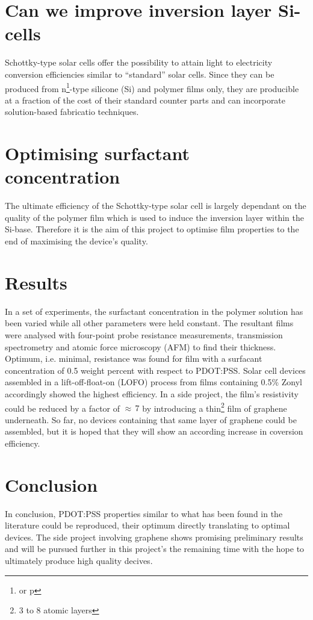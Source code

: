 \message{ !name(abstract.tex)}\documentclass[a4paper]{article}
\begin{document}


\section{Can we improve inversion layer Si-cells}
Schottky-type solar cells offer the possibility to attain light to electricity conversion efficiencies similar to ``standard'' solar cells. Since they can be produced from n\footnote{or p}-type silicone (Si) and polymer films only, they are producible at a fraction of the cost of their standard counter parts and can incorporate solution-based fabricatio techniques.  
\section{Optimising surfactant concentration}
The ultimate efficiency of the Schottky-type solar cell is largely dependant on the quality of the polymer film which is used to induce the inversion layer within the Si-base. Therefore it is the aim of this project to optimise film properties to the end of maximising the device's quality.
\section{Results}
In a set of experiments, the surfactant concentration in the polymer solution has been varied while all other parameters were held constant. The resultant films were analysed with four-point probe resistance measurements, transmission spectrometry and atomic force microscopy (AFM) to find their thickness. Optimum, i.e. minimal, resistance was found for film with a surfacant concentration of 0.5 weight percent with respect to PDOT:PSS. Solar cell devices assembled in a lift-off-float-on (LOFO) process from films containing 0.5\% Zonyl accordingly showed the highest efficiency.\n
In a side project, the film's resistivity could be reduced by a factor of $\approx \, 7$ by introducing a thin\footnote{3 to 8 atomic layers} film of graphene underneath. So far, no devices containing that same layer of graphene could be assembled, but it is hoped that they will show an according increase in coversion efficiency. 
\section{Conclusion}
In conclusion, PDOT:PSS properties similar to what has been found in the literature could be reproduced, their optimum directly translating to optimal devices.\n
The side project involving graphene shows promising preliminary results and will be pursued further in this project's the remaining time with the hope to ultimately produce high quality decives.
\end{document}
